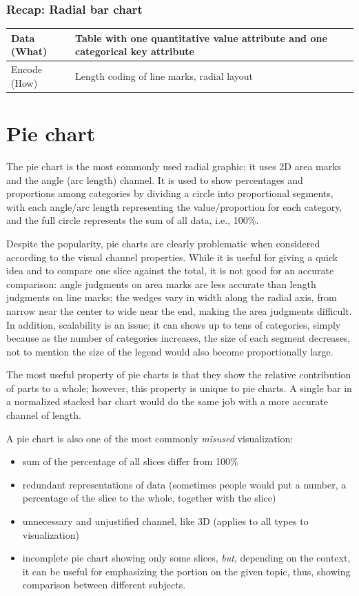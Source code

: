 \subsubsection{Recap: Radial bar chart}
\begin{tabularx}{0.8\textwidth} { 
  | >{\raggedright\arraybackslash}l 
  | >{\raggedright\arraybackslash}X | }
    \hline
    Data (What) & Table with one quantitative value attribute and one categorical key attribute \\
    \hline
    Encode (How) & Length coding of line marks, radial layout \\
    \hline
\end{tabularx}

\section{Pie chart}
The pie chart is the most commonly used radial graphic; it uses 2D area marks and the angle (arc length) channel. It is used to show percentages and proportions among categories by dividing a circle into proportional segments, with each angle/arc length representing the value/proportion for each category, and the full circle represents the sum of all data, i.e., 100\%. \par
Despite the popularity, pie charts are clearly problematic when considered according to the visual channel properties. While it is useful for giving a quick idea and to compare one slice against the total, it is not good for an accurate comparison: angle judgments on area marks are less accurate than length judgments on line marks; the wedges vary in width along the radial axis, from narrow near the center to wide near the end, making the area judgments difficult. In addition, scalability is an issue; it can shows up to tens of categories, simply because as the number of categories increases, the size of each segment decreases, not to mention the size of the legend would also become proportionally large. \par
The most useful property of pie charts is that they show the relative contribution of parts to a whole; however, this property is unique to pie charts. A single bar in a normalized stacked bar chart would do the same job with a more accurate channel of length.\par
A pie chart is also one of the most commonly \textit{misused} visualization:
\begin{itemize}[noitemsep]
    \item sum of the percentage of all slices differ from 100\%
    \item redundant representations of data (sometimes people would put a number, a percentage of the slice to the whole, together with the slice)
    \item unnecessary and unjustified channel, like 3D (applies to all types to visualization)
    \item incomplete pie chart showing only some slices, \textit{but}, depending on the context, it can be useful for emphasizing the portion on the given topic, thus, showing comparison between different subjects.
\end{itemize}

